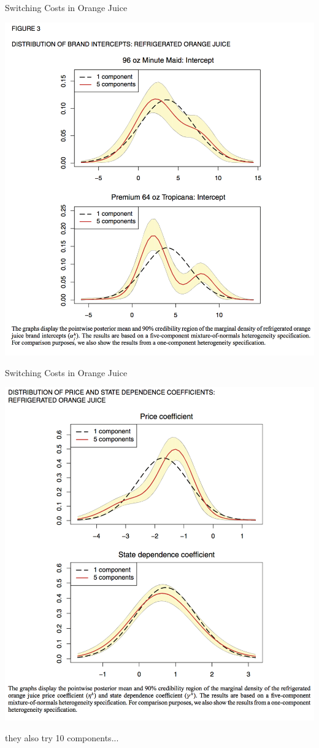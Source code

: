 \documentclass[xcolor=pdftex,dvipsnames,table,mathserif]{beamer}
\begin{document}
\begin{frame}{Switching Costs in Orange Juice}
\begin{center}
\includegraphics[scale=0.33]{resources/OJ_F3.png}
\end{center}
\end{frame}

\begin{frame}{Switching Costs in Orange Juice}
\begin{center}
\includegraphics[scale=0.33]{resources/OJ_F4.png}
\end{center}
they also try 10 components...
\end{frame}
\end{document}
